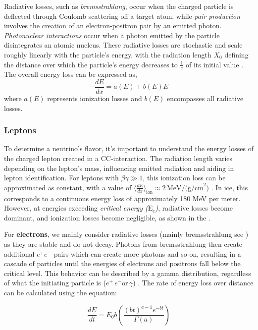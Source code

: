 Radiative losses, such as \emph{bremsstrahlung}, occur when the charged particle is deflected through Coulomb scattering off a target atom, while \emph{pair production} involves the creation of an electron-positron pair by an emitted photon. \emph{Photonuclear interactions} occur when a photon emitted by the particle disintegrates an atomic nucleus. These radiative losses are stochastic and scale roughly linearly with the particle's energy, with the radiation length $ X_0 $ defining the distance over which the particle’s energy decreases to $ \frac{1}{e} $ of its initial value \cite{PDG_2024}. The overall energy loss can be expressed as, 
\begin{equation}\label{eq:1}
    -\frac{dE}{dx} = a(E) + b(E)E 
\end{equation}
where $a(E)$ represents ionization losses and $b(E)$ encompasses all radiative losses.

\subsubsection{Leptons}
\label{sec:leptons_inice}
To determine a neutrino's flavor, it's important to understand the energy losses of the charged lepton created in a CC-interaction. The radiation length varies depending on the lepton's mass, influencing emitted radiation and aiding in lepton identification. For leptons with $ \beta\gamma \gg 1 $, this ionization loss can be approximated as constant, with a value of $ \langle \frac{dE}{dx} \rangle_{\text{ion}} \approx 2 \, \text{MeV/(g/cm}^2) $ . In ice, this corresponds to a continuous energy loss of approximately 180 MeV per meter. However, at energies exceeding \emph{critical energy ($\mathrm{E}_\mathrm{c}$)}, radiative losses become dominant, and ionization losses become negligible, as shown in the  . 

For \textbf{electrons}, we mainly consider radiative losses (mainly bremsstrahlung see ) as they are stable and do not decay. Photons from bremsstrahlung then create additional $e^+e^-$ pairs which can create more photons and so on, resulting in a cascade of particles until the energies of electrons and positrons fall below the critical level. This behavior can be described by a gamma distribution, regardless of what the initiating particle is ($e^+ \, e^- \mathrm{or} \, \gamma$) \cite{PDG_2024}. The rate of energy loss over distance can be calculated using the equation:

\begin{equation}\label{eq:2}
    \frac{dE}{dt} = E_0 b \left( \frac{(bt)^{a-1} e^{-bt}}{\Gamma(a)} \right)
\end{equation}

